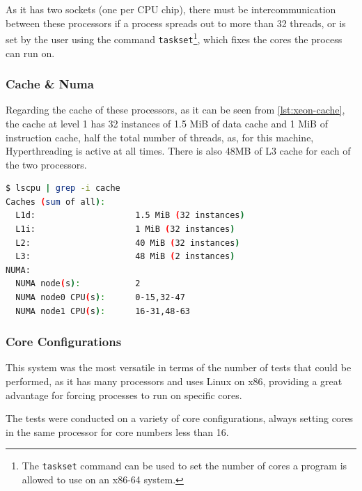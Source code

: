 As it has two sockets (one per CPU chip), there must be intercommunication between these processors if a process spreads out to more than 32 threads, or is set by the user using the command \texttt{taskset}\footnote{The \texttt{taskset} command can be used to set the number of cores a program is allowed to use on an x86-64 system.}, which fixes the cores the process can run on.


\subsubsection{Cache \& Numa}
Regarding the cache of these processors, as it can be seen from \autoref{lst:xeon-cache}, the cache at level 1 has 32 instances of 1.5 MiB of data cache and 1 MiB of instruction cache, half the total number of threads, as, for this machine, Hyperthreading is active at all times. There is also 48MB of L3 cache for each of the two processors.

\begin{lstlisting}[language=bash, caption={Cache of the Intel Xeon Gold 6326}, label={lst:xeon-cache}]
$ lscpu | grep -i cache
Caches (sum of all):
  L1d:                    1.5 MiB (32 instances)
  L1i:                    1 MiB (32 instances)
  L2:                     40 MiB (32 instances)
  L3:                     48 MiB (2 instances)
NUMA:
  NUMA node(s):           2
  NUMA node0 CPU(s):      0-15,32-47
  NUMA node1 CPU(s):      16-31,48-63
\end{lstlisting}

\subsubsection{Core Configurations}

This system was the most versatile in terms of the number of tests that could be performed, as it has many processors and uses Linux on x86, providing a great advantage for forcing processes to run on specific cores.

The tests were conducted on a variety of core configurations, always setting cores in the same processor for core numbers less than 16.

